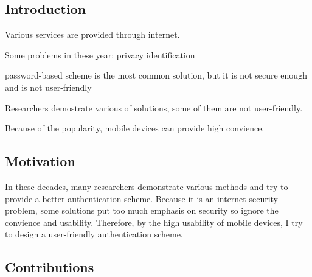 %
%

\begin{CJK}{Bg5}{bsmi}



\chapter{Introduction}

Various services are provided through internet.

Some problems in these year:
	privacy
	identification

password-based scheme is the most common solution, but it is not secure enough and is not user-friendly



Researchers demostrate various of solutions, some of them are not user-friendly.

Because of the popularity, mobile devices can provide high convience.

\begin{comment}
In the age of information, more and more services are provided through the internet. Thought it brings us a convient daily life, there are some problems emerge. First, the convience of internet make the bondaries between people blur. Therefore, it is an important issue about how to protect our privacy.
The second problem is that
\end{comment}

\section{Motivation}

In these decades, many researchers demonstrate various methods and try to provide a better authentication scheme. Because it is an internet security problem, some solutions put too much emphasis on security so ignore the convience and usability. Therefore, by the high usability of mobile devices, I try to design a user-friendly authentication scheme.


\begin{comment}
As authentication system is an important part in the world of internet. A good authentication system may protect everyone's privacy not be invaded by the malicious person. 
So far, because of the easy design, the password-based scheme is the most common solution about authentication issue. However, there were some researches demontrates that this was not a proper solution in both security and usability. 
\end{comment}


\section{Contributions}

\end{CJK}
